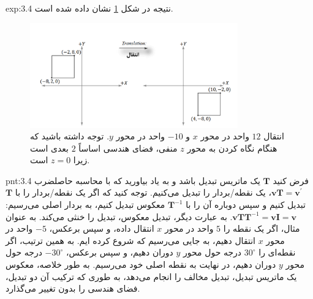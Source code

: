 {\begin{spacing}{1.5}
\begin{example}{exp:3.4}
            نتیجه در شکل \ref{fig:4.Session.1.3.6} نشان داده شده است.

            \begin{figure}[H]
                \centering
                \setlength{\belowcaptionskip}{-10pt}
                \includegraphics[width=0.8\textwidth]{Images/4/3/4.Session.1.3.6}
                \caption {انتقال $12$ واحد در محور $x$ و $-10$ واحد در محور $y$.
                توجه داشته باشید که هنگام نگاه کردن به محور $z$ منفی، فضای هندسی اساساً $2$ بعدی است زیرا $z=0$ است. \textbf{\vspace{20pt}}}
                \label{fig:4.Session.1.3.6}
            \end{figure}
        \end{example}

        \begin{point}{pnt:3.4}
            \Large
            فرض کنید $\textbf{T}$ یک ماتریس تبدیل باشد و به یاد بیاورید که با محاسبه حاصلضرب $\textbf{vT}=\textbf{v}^\prime$، یک نقطه/بردار را تبدیل می‌کنیم.
            توجه کنید که اگر یک نقطه/بردار را با $\textbf{T}$ تبدیل کنیم و سپس دوباره آن را با $\textbf{T}^{-1}$ معکوس تبدیل کنیم،
            به بردار اصلی می‌رسیم: $\textbf{vT}\textbf{T}^{-1}=\textbf{vI}=\textbf{v}$.
            به عبارت دیگر، تبدیل معکوس، تبدیل را خنثی می‌کند.
            به عنوان مثال، اگر یک نقطه را $5$ واحد در محور $x$ انتقال داده، و سپس برعکس، $-5$ واحد در محور $x$ انتقال دهیم، به جایی می‌رسیم که شروع کرده ایم.
            به همین ترتیب، اگر نقطه‌ای را $30^\circ$ درجه حول محور $y$ دوران دهیم، و سپس برعکس، $-30^\circ$ درجه حول محور $y$ دوران دهیم، در نهایت به نقطه اصلی خود می‌رسیم.
            به طور خلاصه، معکوس یک ماتریس تبدیل، تبدیل مخالف را انجام می‌دهد، به طوری که ترکیب آن دو تبدیل، فضای هندسی را بدون تغییر می‌گذارد.
        \end{point}
    \end{spacing}
}

